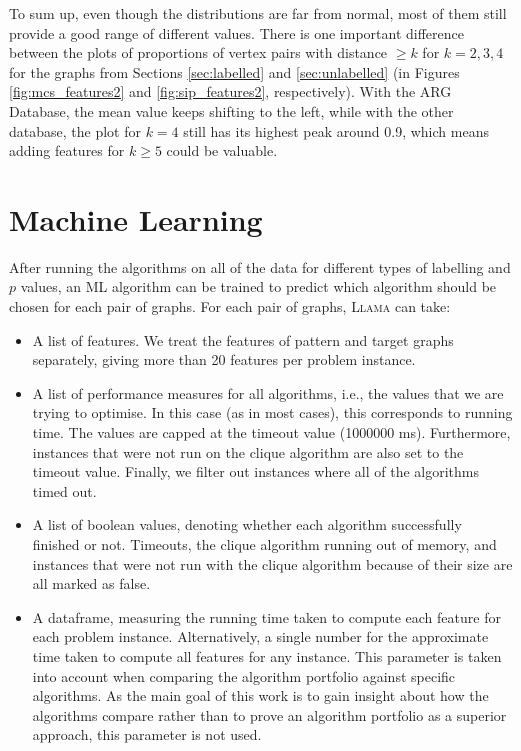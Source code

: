 \documentclass{l4proj}
\theoremstyle{definition}
\theoremstyle{remark}
\begin{document}
To sum up, even though the distributions are far from normal, most of them still
provide a good range of different values. There is one important difference
between the plots of proportions of vertex pairs with distance $\ge k$ for $k =
2, 3, 4$ for the graphs from Sections \ref{sec:labelled} and \ref{sec:unlabelled} (in Figures
\ref{fig:mcs_features2} and \ref{fig:sip_features2}, respectively). With
the ARG Database, the mean value keeps shifting to the left, while with the
other database, the plot for $k = 4$ still has its highest peak around 0.9,
which means adding features for $k \ge 5$ could be valuable.

\chapter{Machine Learning}
After running the algorithms on all of the data for different types of labelling
and $p$ values, an ML algorithm can be trained to predict which algorithm should
be chosen for each pair of graphs. For each pair of graphs, \textsc{Llama} can
take:

\begin{itemize}
\item A list of features. We treat the features of pattern and target graphs
  separately, giving more than 20 features per problem instance.
\item A list of performance measures for all algorithms, i.e., the values that
  we are trying to optimise. In this case (as in most cases), this corresponds
  to running time. The values are capped at the timeout value (\num{1000000} ms).
  Furthermore, instances that were not run on the clique algorithm are also set
  to the timeout value. Finally, we filter out instances where all of the
  algorithms timed out.
\item A list of boolean values, denoting whether each algorithm successfully
  finished or not. Timeouts, the clique algorithm running out of memory, and
  instances that were not run with the clique algorithm because of their size
  are all marked as false.
\item A dataframe, measuring the running time taken to compute each feature for
  each problem instance. Alternatively, a single number for the approximate time
  taken to compute all features for any instance. This parameter is taken into
  account when comparing the algorithm portfolio against specific algorithms. As
  the main goal of this work is to gain insight about how the algorithms compare
  rather than to prove an algorithm portfolio as a superior approach, this
  parameter is not used.
\end{itemize}
\end{document}
